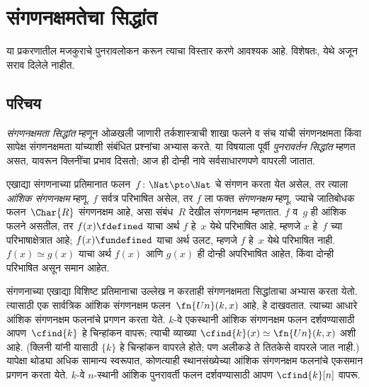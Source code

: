 \chapter{संगणनक्षमतेचा सिद्धांत}\label{cmp:thy::chap}
\begin{editorial}
  या प्रकरणातील मजकुराचे पुनरावलोकन करून त्याचा विस्तार करणे आवश्यक आहे.
  विशेषतः, येथे अजून सराव दिलेले नाहीत.
\end{editorial}








\section{परिचय}\label{cmp:thy:int:sec}

\emph{संगणनक्षमता सिद्धांत} म्हणून ओळखली जाणारी तर्कशास्त्राची शाखा
फलने व संच यांची संगणनक्षमता किंवा सापेक्ष संगणनक्षमता यांच्याशी संबंधित
प्रश्नांचा अभ्यास करते. या विषयाला पूर्वी \emph{पुनरावर्तन सिद्धांत}
म्हणत असत, यावरून क्लिनींचा प्रभाव दिसतो; आज ही दोन्ही नावे
सर्वसाधारणपणे वापरली जातात.

एखाद्या संगणनाच्या प्रतिमानात फलन~$f\colon \Nat \pto \Nat$ चे संगणन
करता येत असेल, तर त्याला \emph{आंशिक संगणनक्षम} म्हणू. $f$ सर्वत्र
परिभाषित असेल, तर $f$ ला फक्त \emph{संगणनक्षम} म्हणू. ज्याचे
जातिबोधक फलन~$\Char{R}$ संगणनक्षम आहे, असा संबंध~$R$ देखील
संगणनक्षम म्हणतात. $f$ व~$g$ ही आंशिक फलने असतील, तर
$f(x) \fdefined$ याचा अर्थ $f$ हे~$x$ येथे परिभाषित आहे, म्हणजे
$x$ हे~$f$ च्या परिभाषाक्षेत्रात आहे; $f(x) \fundefined$ याचा
अर्थ उलट, म्हणजे $f$ हे~$x$ येथे परिभाषित नाही. $f(x) \simeq g(x)$
याचा अर्थ $f(x)$ आणि $g(x)$ ही दोन्ही अपरिभाषित आहेत, किंवा दोन्ही
परिभाषित असून समान आहेत.

संगणनाच्या एखाद्या विशिष्ट प्रतिमानाचा उल्लेख न करताही संगणनक्षमता
सिद्धांताचा अभ्यास करता येतो. त्यासाठी एक सार्वत्रिक आंशिक संगणनक्षम
फलन~$\fn{Un}(k, x)$ आहे, हे दाखवतात. त्याच्या आधारे आंशिक संगणनक्षम
फलनांचे प्रगणन करता येते. $k$-वे एकस्थानी आंशिक संगणनक्षम फलन दर्शवण्यासाठी
आपण~$\cfind{k}$ हे चिन्हांकन वापरू; त्याची व्याख्या
$\cfind{k}(x) \simeq \fn{Un}(k, x)$ अशी आहे. (क्लिनी यांनी यासाठी
$\{ k \}$ हे चिन्हांकन वापरले होते; पण अलीकडे ते तितकेसे वापरले
जात नाही.) यापेक्षा थोड्या अधिक सामान्य स्वरूपात, कोणत्याही
स्थानसंख्येच्या आंशिक संगणनक्षम फलनांचे एकसमान प्रगणन करता येते.
$k$-वे $n$-स्थानी आंशिक पुनरावर्ती फलन दर्शवण्यासाठी आपण
$\cfind{k}[n]$ वापरू.

